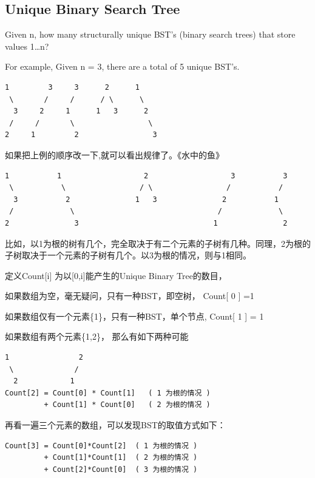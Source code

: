 \documentclass[12pt]{book}
\begin{document}
\subsection{Unique Binary Search Tree}
\label{sec-14-2-4}
Given n, how many structurally unique BST's (binary search trees) that store values 1\ldots{}n?

For example, Given n = 3, there are a total of 5 unique BST's.
\lstset{language=java,label= ,caption= ,numbers=none}
\begin{lstlisting}
1         3     3      2      1
 \       /     /      / \      \
  3     2     1      1   3      2
 /     /       \                 \
2     1         2                 3
\end{lstlisting}

如果把上例的顺序改一下,就可以看出规律了。《水中的鱼》
\lstset{language=java,label= ,caption= ,numbers=none}
\begin{lstlisting}
1           1                   2                   3           3
 \           \                 / \                 /           / 
  3           2               1   3               2           1
 /             \                                 /             \
2               3                               1               2
\end{lstlisting}

比如，以1为根的树有几个，完全取决于有二个元素的子树有几种。同理，2为根的子树取决于一个元素的子树有几个。以3为根的情况，则与1相同。

定义Count[i] 为以[0,i]能产生的Unique Binary Tree的数目，

如果数组为空，毫无疑问，只有一种BST，即空树， Count[ 0 ] =1

如果数组仅有一个元素\{1\}，只有一种BST，单个节点, Count[ 1 ] = 1

如果数组有两个元素\{1,2\}， 那么有如下两种可能
\lstset{language=java,label= ,caption= ,numbers=none}
\begin{lstlisting}
1                2
 \              /
  2            1
Count[2] = Count[0] * Count[1]   ( 1 为根的情况 )
         + Count[1] * Count[0]   ( 2 为根的情况 )
\end{lstlisting}

再看一遍三个元素的数组，可以发现BST的取值方式如下：
\lstset{language=java,label= ,caption= ,numbers=none}
\begin{lstlisting}
Count[3] = Count[0]*Count[2]  ( 1 为根的情况 )
         + Count[1]*Count[1]  ( 2 为根的情况 )
         + Count[2]*Count[0]  ( 3 为根的情况 )
\end{lstlisting}
\end{document}
